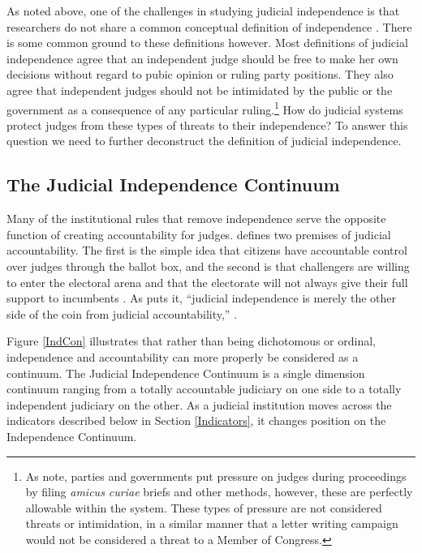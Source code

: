 \documentclass[12pt]{article}
\begin{document}
As noted above, one of the challenges in studying judicial independence is that researchers do not share a common conceptual definition of independence \citep{Linzer2014}.  There is some common ground to these definitions however.  Most definitions of judicial independence agree that an independent judge should be free to make her own decisions without regard to pubic opinion or ruling party positions.  They also agree that independent judges should not be intimidated by the public or the government as a consequence of any particular ruling.\footnote{As \citet[4]{Rios2014} note, parties and governments put pressure on judges during proceedings by filing \textit{amicus curiae} briefs and other methods, however, these are perfectly allowable within the system.  These types of pressure are not considered threats or intimidation, in a similar manner that a letter writing campaign would not be considered a threat to a Member of Congress.}  How do judicial systems protect judges from these types of threats to their independence?  To answer this question we need to further deconstruct the definition of judicial independence. 

\subsection*{The Judicial Independence Continuum}
Many of the institutional rules that remove independence serve the opposite function of creating accountability for judges.  \citet{Hall2007} defines two premises of judicial accountability. The first is the simple idea that citizens have accountable control over judges through the ballot box, and the second is that challengers are willing to enter the electoral arena and that the electorate will not always give their full support to incumbents \citep[166]{Hall2007}.  As \citeauthor{Burbank2008} puts it, ``judicial independence is merely the other side of the coin from judicial accountability,'' \citep[17]{Burbank2008}.

Figure \ref{IndCon} illustrates that rather than being dichotomous or ordinal, independence and accountability can more properly be considered as a continuum.  The Judicial Independence Continuum is a single dimension continuum ranging from  a totally accountable judiciary on one side to a totally independent judiciary on the other.  As a judicial institution moves across the indicators described below in Section \ref{Indicators}, it changes position on the Independence Continuum. 
\end{document}
